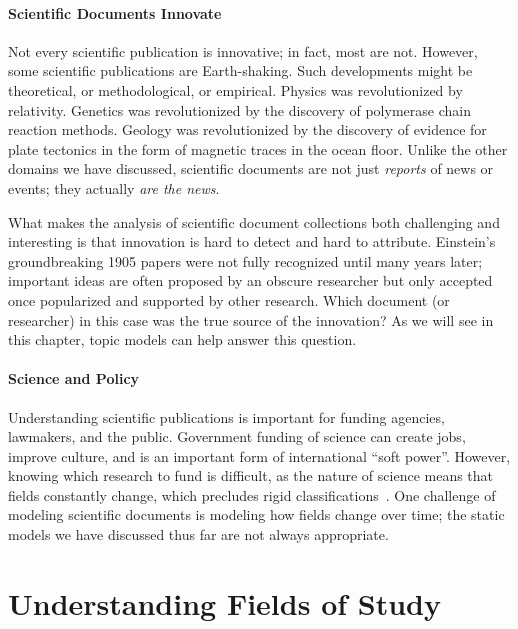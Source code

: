 \paragraph{Scientific Documents Innovate}

Not every scientific publication is innovative;
in fact, most are not.  However, some scientific publications are
Earth-shaking. Such developments might be theoretical, or methodological, or empirical.
Physics was revolutionized by relativity.
Genetics was revolutionized by the discovery of polymerase chain reaction methods.
Geology was revolutionized by the discovery of evidence for plate tectonics in the form of magnetic traces in the ocean floor. Unlike the other domains we have
discussed, scientific documents are not just \emph{reports} of news or events;
they actually \emph{are the news}.

What makes the analysis of scientific document collections both challenging and
interesting is that innovation is hard to detect and hard to attribute.
Einstein's groundbreaking 1905 papers were not fully recognized until many years
later; important ideas are often proposed by an obscure researcher but only accepted
once popularized and supported by other research. Which document (or researcher)
in this case was the true source of the innovation?  As we will see in this
chapter, topic models can help answer this question.

\paragraph{Science and Policy}

Understanding scientific publications is important for funding agencies,
lawmakers, and the public.  Government funding of science can create jobs,
improve culture, and is an important form of international ``soft power''.
However, knowing which research to fund is difficult, as the nature of science
means that fields constantly change, which precludes rigid
classifications~\citep{szostak-04}.  One challenge of modeling scientific
documents is modeling how fields change over time; the static models we have
discussed thus far are not always appropriate.

\section{Understanding Fields of Study}
\label{sec:sci_fields}

